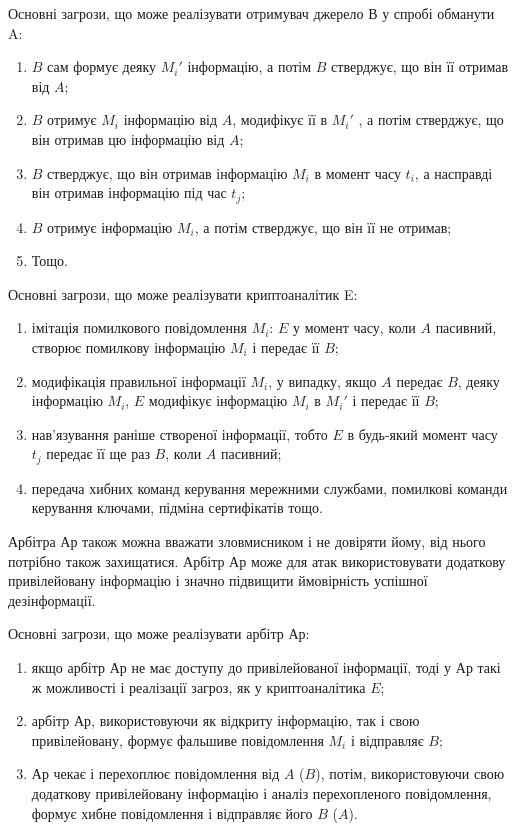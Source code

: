 Основні загрози, що може реалізувати отримувач джерело В у спробі обманути A:
\begin{enumerate}
    \item $B$ сам формує деяку $M_i'$ інформацію, а потім $B$ стверджує, що він її
        отримав від $A$;
    \item $B$ отримує $M_i$ інформацію від $A$, модифікує її в $M_i'$ , а потім стверджує,
        що він отримав цю інформацію від $A$;
    \item $B$ стверджує, що він отримав інформацію $M_i$ в момент часу $t_i$, а
        насправді він отримав інформацію під час $t_j$;
    \item $B$ отримує інформацію $M_i$, а потім стверджує, що він її не отримав;
    \item Тощо.
\end{enumerate}

Основні загрози, що може реалізувати криптоаналітик E:
\begin{enumerate}
    \item імітація помилкового повідомлення $M_i$: $E$ у момент часу, коли $A$
        пасивний, створює помилкову інформацію $M_i$ і передає її $B$;
    \item модифікація правильної інформації $M_i$, у випадку, якщо $A$ передає $B$,
    деяку інформацію $M_i$, $E$ модифікує інформацію $M_i$ в $M_i'$ і передає її $B$;
    \item нав'язування раніше створеної інформації, тобто $E$ в будь-який
        момент часу $t_j$ передає її ще раз $B$, коли $A$ пасивний;
    \item передача хибних команд керування мережними службами,
        помилкові команди керування ключами, підміна сертифікатів тощо.
\end{enumerate}

Арбітра Ар також можна вважати зловмисником і не довіряти йому, від
нього потрібно також захищатися. Арбітр Ар може для атак використовувати
додаткову привілейовану інформацію і значно підвищити ймовірність успішної
дезінформації.

Основні загрози, що може реалізувати арбітр Ар:
\begin{enumerate}
    \item якщо арбітр Ар не має доступу до привілейованої інформації, тоді у Ар такі
        ж можливості і реалізації загроз, як у криптоаналітика $E$;
    \item арбітр Ар, використовуючи як відкриту інформацію, так і свою
        привілейовану, формує фальшиве повідомлення $M_i$ і відправляє $B$;
    \item Ар чекає і перехоплює повідомлення від $A$ ($B$), потім, використовуючи свою
        додаткову привілейовану інформацію і аналіз перехопленого повідомлення,
        формує хибне повідомлення і відправляє його $B$ ($A$).
\end{enumerate}

